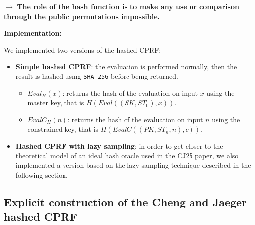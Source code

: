 \documentclass[9pt]{extarticle}
\begin{document}
$\rightarrow$ \textbf{The role of the hash function is to make any use or comparison
through the public permutations impossible.}

\begin{center}
\end{center}

\textbf{Implementation:}

We implemented two versions of the hashed CPRF:

\begin{itemize}
  \item \textbf{Simple hashed CPRF}: the evaluation is performed normally,
  then the result is hashed using \texttt{SHA-256} before being returned.
    \begin{itemize}
      \item \texttt{$Eval_H(x)$}: returns the hash of the evaluation on input $x$ using the master key, that is $H(Eval((SK, ST_0), x))$.
      \item \texttt{$EvalC_H(n)$}: returns the hash of the evaluation on input $n$ using the constrained key, that is $H(EvalC((PK, ST_n, n), c))$.\\
    \end{itemize}

  \item \textbf{Hashed CPRF with lazy sampling}: in order to get closer to the
  theoretical model of an ideal hash oracle used in the CJ25 paper, we also implemented
  a version based on the lazy sampling technique described in the following section.
\end{itemize}

\newpage
\subsection{Explicit construction of the Cheng and Jaeger hashed CPRF}
\end{document}

